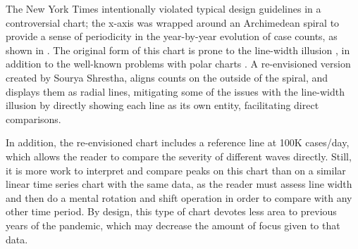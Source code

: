 \documentclass[article]{jdssv}\usepackage[]{graphicx}\usepackage[]{xcolor}
\begin{document}
The New York Times intentionally violated typical design guidelines in a controversial chart; the x-axis was wrapped around an Archimedean spiral to provide a sense of periodicity in the year-by-year evolution of case counts, as shown in . The original form of this chart is prone to the line-width illusion \citep{vanderplasSignsSineIllusion2015}, in addition to the well-known problems with polar charts \citep{hofmannGraphicalTestsPower2012,waldnerComparisonRadialLinear2020}. A re-envisioned version created by Sourya Shrestha, aligns counts on the outside of the spiral, and displays them as radial lines, mitigating some of the issues with the line-width illusion by directly showing each line as its own entity, facilitating direct comparisons. 

In addition, the re-envisioned chart includes a reference line at 100K cases/day, which allows the reader to compare the severity of different waves directly. Still, it is more work to interpret and compare peaks on this chart than on a similar linear time series chart with the same data, as the reader must assess line width and then do a mental rotation and shift operation in order to compare with any other time period. By design, this type of chart devotes less area to previous years of the pandemic, which may decrease the amount of focus given to that data.%
\end{document}
